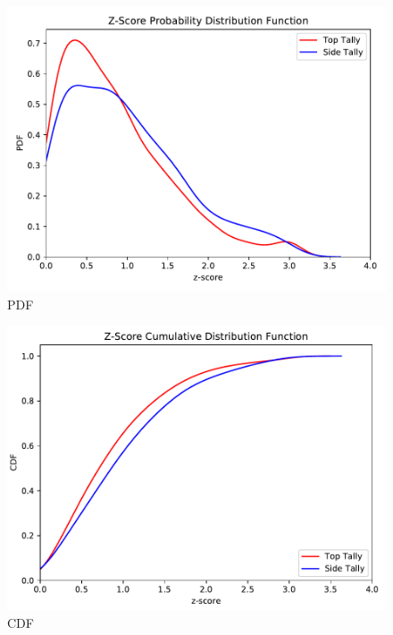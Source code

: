 \begin{figure}[!h]
    \centering
    \includegraphics[scale=0.6, trim={0cm 0cm 0cm 0cm}, clip]{figs/dose_pdf.pdf}
    \caption{PDF}
    \label{fig:dose_pdf}
\end{figure}
\begin{figure}[!h]
    \centering
    \includegraphics[scale=0.6, trim={0cm 0cm 0cm 0cm}, clip]{figs/dose_cdf.pdf}
    \caption{CDF}
    \label{fig:dose_cdf}
\end{figure}

